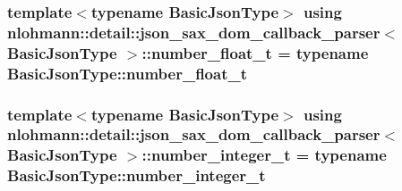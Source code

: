 \subsubsection[{\texorpdfstring{number\+\_\+float\+\_\+t}{number_float_t}}]{\setlength{\rightskip}{0pt plus 5cm}template$<$typename Basic\+Json\+Type$>$ using {\bf nlohmann\+::detail\+::json\+\_\+sax\+\_\+dom\+\_\+callback\+\_\+parser}$<$ Basic\+Json\+Type $>$\+::{\bf number\+\_\+float\+\_\+t} =  typename Basic\+Json\+Type\+::number\+\_\+float\+\_\+t}\hypertarget{classnlohmann_1_1detail_1_1json__sax__dom__callback__parser_a914ea0555cea5290449fb791ae41c655}{}\label{classnlohmann_1_1detail_1_1json__sax__dom__callback__parser_a914ea0555cea5290449fb791ae41c655}
\subsubsection[{\texorpdfstring{number\+\_\+integer\+\_\+t}{number_integer_t}}]{\setlength{\rightskip}{0pt plus 5cm}template$<$typename Basic\+Json\+Type$>$ using {\bf nlohmann\+::detail\+::json\+\_\+sax\+\_\+dom\+\_\+callback\+\_\+parser}$<$ Basic\+Json\+Type $>$\+::{\bf number\+\_\+integer\+\_\+t} =  typename Basic\+Json\+Type\+::number\+\_\+integer\+\_\+t}\hypertarget{classnlohmann_1_1detail_1_1json__sax__dom__callback__parser_a3ba8fc7a8d83c5b0eeb3b543ad844b8d}{}\label{classnlohmann_1_1detail_1_1json__sax__dom__callback__parser_a3ba8fc7a8d83c5b0eeb3b543ad844b8d}

